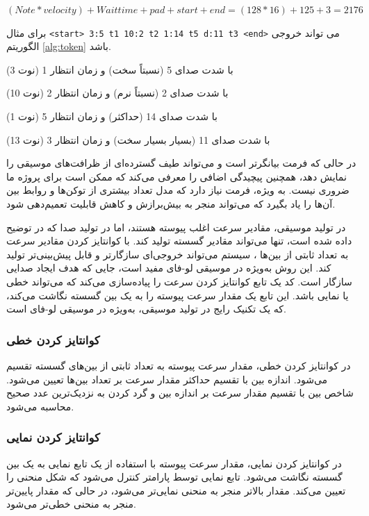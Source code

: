 $ (Note * velocity) + Wait  time + pad + start + end =(128 * 16) + 125 + 3 = 2176$
\begin{example}[]
      \centering
      \label{example:token}
      برای مثال \texttt{<start> 3:5 t1  10:2 t2  1:14 t5  d:11 t3 <end>} می تواند خروجی الگوریتم \ref{alg:token} باشد.

       (نوت 3) با شدت صدای 5 (نسبتاً سخت) و زمان انتظار 1

       (نوت 10) با شدت صدای 2 (نسبتاً نرم) و زمان انتظار 2

       (نوت 1) با شدت صدای 14 (حداکثر) و زمان انتظار 5

       (نوت 13) با شدت صدای 11 (بسیار بسیار سخت) و زمان انتظار 3
\end{example}

در حالی که فرمت  بیانگرتر است و می‌تواند طیف گسترده‌ای از ظرافت‌های
موسیقی را نمایش دهد، همچنین پیچیدگی اضافی را معرفی می‌کند  که ممکن است
برای پروژه ما ضروری نیست. به ویژه، فرمت  نیاز دارد که مدل تعداد
بیشتری از توکن‌ها و روابط بین آن‌ها را یاد بگیرد که می‌تواند منجر به
بیش‌برازش و کاهش قابلیت تعمیم‌دهی شود.

در تولید موسیقی، مقادیر سرعت  اغلب پیوسته هستند، اما
در تولید صدا که در   توضیح داده شده است، تنها می‌تواند مقادیر گسسته تولید کند. با کوانتایز کردن
مقادیر سرعت به تعداد ثابتی از بین‌ها ، سیستم می‌تواند خروجی‌ای
سازگارتر و قابل پیش‌بینی‌تر تولید کند. این روش به‌ویژه در موسیقی لو-فای
مفید است، جایی که هدف ایجاد صدایی سازگار است. کد یک تابع
کوانتایز کردن سرعت را پیاده‌سازی می‌کند که می‌تواند خطی یا نمایی باشد. این
تابع یک مقدار سرعت پیوسته را به یک بین گسسته نگاشت می‌کند، که یک تکنیک
رایج در تولید موسیقی، به‌ویژه در موسیقی لو-فای است.

\subsubsection{کوانتایز کردن
      خطی}

در کوانتایز کردن خطی، مقدار سرعت پیوسته به تعداد ثابتی از بین‌های گسسته
تقسیم می‌شود. اندازه بین با تقسیم حداکثر مقدار سرعت بر تعداد بین‌ها تعیین
می‌شود. شاخص بین با تقسیم مقدار سرعت بر اندازه بین و گرد کردن به
نزدیک‌ترین عدد صحیح محاسبه می‌شود.

\subsubsection{کوانتایز کردن
      نمایی}
در کوانتایز کردن نمایی، مقدار سرعت پیوسته با استفاده از یک تابع نمایی به
یک بین گسسته نگاشت می‌شود. تابع نمایی توسط پارامتر  کنترل
می‌شود که شکل منحنی را تعیین می‌کند. مقدار بالاتر  منجر به
منحنی نمایی‌تر می‌شود، در حالی که مقدار پایین‌تر منجر به منحنی خطی‌تر می‌شود.

